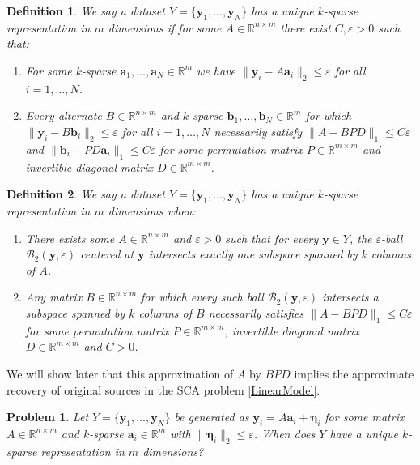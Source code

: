 \documentclass[journal, onecolumn]{IEEEtran}
\newtheorem{problem}{Problem}
\newtheorem{definition}{Definition}
\begin{document}
\begin{definition}\label{Uniqueness}
We say a dataset $Y = \{\mathbf{y}_1, \ldots, \mathbf{y}_N\}$ has a unique $k$-sparse representation in $m$ dimensions if for some $A \in \mathbb{R}^{n \times m}$ there exist $C, \varepsilon > 0$ such that:
\begin{enumerate}
\item For some $k$-sparse $\mathbf{a}_1, \ldots, \mathbf{a}_N \in \mathbb{R}^m$ we have $\|\mathbf{y}_i - A\mathbf{a}_i\|_2 \leq \varepsilon$ for all $i = 1, \ldots, N$.
\item Every alternate $B \in \mathbb{R}^{n \times m}$ and $k$-sparse $\mathbf{b}_1, \ldots, \mathbf{b}_N \in \mathbb{R}^m$ for which $\|\mathbf{y}_i - B\mathbf{b}_i\|_2 \leq \varepsilon$ for all $i = 1, \ldots, N$ necessarily satisfy $\|A - BPD\|_1 \leq C\varepsilon$ and $\|\mathbf{b}_i - PD\mathbf{a}_i\|_1 \leq C\varepsilon$ for some permutation matrix $P \in \mathbb{R}^{m \times m}$ and invertible diagonal matrix $D \in \mathbb{R}^{m \times m}$.
\end{enumerate}
\end{definition}

\begin{definition}\label{Uniqueness}
We say a dataset $Y = \{\mathbf{y}_1, \ldots, \mathbf{y}_N\}$ has a unique $k$-sparse representation in $m$ dimensions when:
\begin{enumerate}
\item There exists some $A \in \mathbb{R}^{n \times m}$ and $\varepsilon > 0$ such that for every $\mathbf{y} \in Y$, the $\varepsilon$-ball $\mathcal{B}_2(\mathbf{y}, \varepsilon)$ centered at $\mathbf{y}$ intersects exactly one subspace spanned by $k$ columns of $A$.
\item Any matrix $B \in \mathbb{R}^{n \times m}$ for which every such ball $\mathcal{B}_2(\mathbf{y}, \varepsilon)$ intersects a subspace spanned by $k$ columns of $B$ necessarily satisfies $\|A - BPD\|_1 \leq C\varepsilon$ for some permutation matrix $P \in \mathbb{R}^{m \times m}$, invertible diagonal matrix $D \in \mathbb{R}^{m \times m}$ and $C > 0$.
\end{enumerate}
\end{definition}

We will show later that this approximation of $A$ by $BPD$ implies the approximate recovery of original sources in the SCA problem \eqref{LinearModel}.

\begin{problem}\label{DUTproblem}
Let $Y = \{\mathbf{y}_1, \ldots, \mathbf{y}_N \}$ be generated as $\mathbf{y}_i = A\mathbf{a}_i  + \mathbf{\eta}_i$ for some matrix $A \in \mathbb{R}^{n \times m}$ and $k$-sparse $\mathbf{a}_i \in \mathbb{R}^m$ with $\|\mathbf{\eta}_i\|_2 \leq \varepsilon$. When does $Y$ have a unique $k$-sparse representation in $m$ dimensions?
\end{problem}
\end{document}
